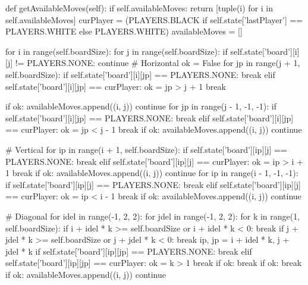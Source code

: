 \begin{latin}
\begin{python}
    def getAvailableMoves(self):
        if self.availableMoves:
            return [tuple(i) for i in self.availableMoves]
        curPlayer = (PLAYERS.BLACK if 
                self.state['lastPlayer'] == PLAYERS.WHITE else PLAYERS.WHITE)
        availableMoves = []
        
        for i in range(self.boardSize):
            for j in range(self.boardSize):
                if self.state['board'][i][j] != PLAYERS.NONE:
                    continue
                # Horizontal
                ok = False
                for jp in range(j + 1, self.boardSize):
                    if self.state['board'][i][jp] == PLAYERS.NONE:
                        break
                    elif self.state['board'][i][jp] == curPlayer:
                        ok = jp > j + 1
                        break

                if ok:
                    availableMoves.append((i, j))
                    continue
                for jp in range(j - 1, -1, -1):
                    if self.state['board'][i][jp] == PLAYERS.NONE:
                        break
                    elif self.state['board'][i][jp] == curPlayer:
                        ok = jp < j - 1
                        break
                if ok:
                    availableMoves.append((i, j))
                    continue


                # Vertical
                for ip in range(i + 1, self.boardSize):
                    if self.state['board'][ip][j] == PLAYERS.NONE:
                        break
                    elif self.state['board'][ip][j] == curPlayer:
                        ok = ip > i + 1
                        break
                if ok:
                    availableMoves.append((i, j))
                    continue
                for ip in range(i - 1, -1, -1):
                    if self.state['board'][ip][j] == PLAYERS.NONE:
                        break
                    elif self.state['board'][ip][j] == curPlayer:
                        ok = ip < i - 1
                        break
                if ok:
                    availableMoves.append((i, j))
                    continue

                # Diagonal
                for idel in range(-1, 2, 2):
                    for jdel in range(-1, 2, 2):
                        for k in range(1, self.boardSize):
                            if i + idel * k >= self.boardSize or i + idel * k < 0:
                                break
                            if j + jdel * k >= self.boardSize or j + jdel * k < 0:
                                break
                            ip, jp = i + idel * k, j + jdel * k
                            if self.state['board'][ip][jp] == PLAYERS.NONE:
                                break
                            elif self.state['board'][ip][jp] == curPlayer:
                                ok = k > 1
                                break
                        if ok: break
                    if ok: break
                if ok:
                    availableMoves.append((i, j))
                    continue


\end{python}
\end{latin}
